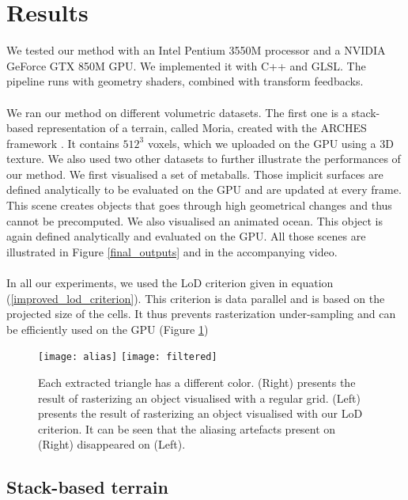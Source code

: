 \section{Results}

We tested our method with an Intel Pentium 3550M processor and a NVIDIA GeForce GTX 850M GPU. 
We implemented it with C++ and GLSL. 
The pipeline runs with geometry shaders, combined with transform feedbacks. 

\paragraph{}
We ran our method on different volumetric datasets.
The first one is a stack-based representation of a terrain, called Moria, created with the ARCHES framework \cite{peytavie2009arches}.
It contains $512^3$ voxels, which we uploaded on the GPU using a 3D texture.
We also used two other datasets to further illustrate the performances of our method.
We first visualised a set of metaballs.
Those implicit surfaces are defined analytically to be evaluated on the GPU and are updated at every frame.
This scene creates objects that goes through high geometrical changes and thus cannot be precomputed.
We also visualised an animated ocean.
This object is again defined analytically and evaluated on the GPU. 
All those scenes are illustrated in Figure \ref{final_outputs} and in the accompanying video.

\paragraph{}
In all our experiments, we used the LoD criterion given in equation (\ref{improved_lod_criterion}).
This criterion is data parallel and is based on the projected size of the cells.
It thus prevents rasterization under-sampling and can be efficiently used on the GPU (Figure \ref{lod})

\begin{figure}
\centering
\texttt{[image: alias]}
\hfill
\texttt{[image: filtered]}
\caption{Each extracted triangle has a different color. (Right) presents the result of rasterizing an object visualised with a regular grid. (Left) presents the result of rasterizing an object visualised with our LoD criterion. It can be seen that the aliasing artefacts present on (Right) disappeared on (Left).}
\label{lod}
\end{figure}

\subsection{Stack-based terrain}

